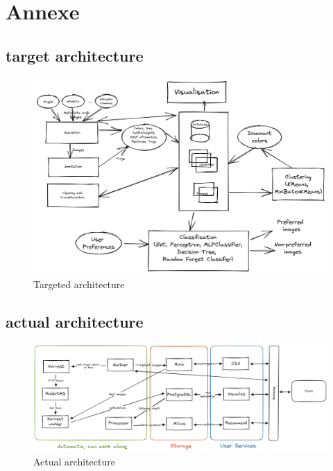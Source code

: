 \documentclass{article}
\begin{document}
    \newpage
    \appendix


    \section{Annexe}\label{sec:annexe}

    \subsection{target architecture}\label{subsec:target_architecture}

    \begin{figure}[htbp]
        \centering
        \includegraphics[width=0.8 \textwidth]{img/targeted_archi}
        \caption{Targeted architecture}
        \label{fig:targeted_architecture}
    \end{figure}

    \subsection{actual architecture}\label{subsec:actual_architecture}

    \begin{figure}[htbp]
        \centering
        \includegraphics[width=1.2\textwidth]{img/actual_architecture}
        \caption{Actual architecture}
        \label{fig:actual_architecture}
    \end{figure}
\end{document}
